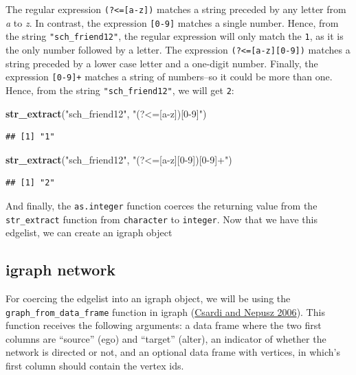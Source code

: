 \documentclass[
]{book}
\newenvironment{Shaded}{\begin{snugshade}}{\end{snugshade}}
\newcommand{\FunctionTok}[1]{\textcolor[rgb]{0.13,0.29,0.53}{\textbf{#1}}}
\newcommand{\NormalTok}[1]{#1}
\newcommand{\StringTok}[1]{\textcolor[rgb]{0.31,0.60,0.02}{#1}}
\begin{document}
\begin{enumerate}
  The regular expression \texttt{(?\textless{}={[}a-z{]})} matches a string preceded by any letter from \emph{a} to \emph{z}. In contrast, the expression \texttt{{[}0-9{]}} matches a single number. Hence, from the string \texttt{"sch\_friend12"}, the regular expression will only match the \texttt{1}, as it is the only number followed by a letter. The expression \texttt{(?\textless{}={[}a-z{]}{[}0-9{]})} matches a string preceded by a lower case letter and a one-digit number. Finally, the expression \texttt{{[}0-9{]}+} matches a string of numbers--so it could be more than one. Hence, from the string \texttt{"sch\_friend12"}, we will get \texttt{2}:

\begin{Shaded}
\begin{Highlighting}[]
\FunctionTok{str\_extract}\NormalTok{(}\StringTok{"sch\_friend12"}\NormalTok{, }\StringTok{"(?\textless{}=[a{-}z])[0{-}9]"}\NormalTok{)}
\end{Highlighting}
\end{Shaded}

\begin{verbatim}
## [1] "1"
\end{verbatim}

\begin{Shaded}
\begin{Highlighting}[]
\FunctionTok{str\_extract}\NormalTok{(}\StringTok{"sch\_friend12"}\NormalTok{, }\StringTok{"(?\textless{}=[a{-}z][0{-}9])[0{-}9]+"}\NormalTok{)}
\end{Highlighting}
\end{Shaded}

\begin{verbatim}
## [1] "2"
\end{verbatim}

  And finally, the \texttt{as.integer} function coerces the returning value from the \texttt{str\_extract} function from \texttt{character} to \texttt{integer}. Now that we have this edgelist, we can create an igraph object
\end{enumerate}

\hypertarget{igraph-network}{%
\subsection{igraph network}\label{igraph-network}}

For coercing the edgelist into an igraph object, we will be using the \texttt{graph\_from\_data\_frame} function in igraph (\protect\hyperlink{ref-R-igraph}{Csardi and Nepusz 2006}). This function receives the following arguments: a data frame where the two first columns are ``source'' (ego) and ``target'' (alter), an indicator of whether the network is directed or not, and an optional data frame with vertices, in which's first column should contain the vertex ids.
\end{document}
